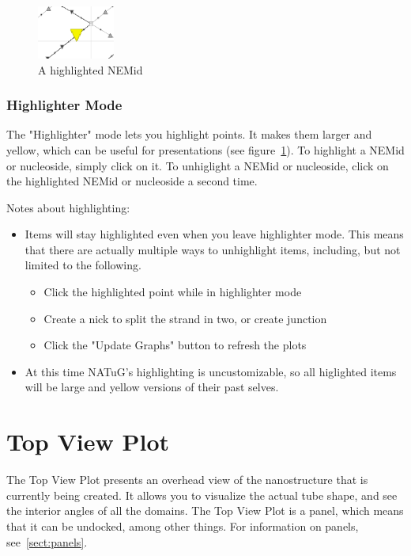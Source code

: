 \documentclass[
titlepage,
fontsize=12pt
]{article}
\begin{document}
	\begin{figure}
		\centering
		\includegraphics[width=1in]{highlighted-nemid.png}
		\caption{A highlighted NEMid}
		\label{fig:highlighted-NEMid}
	\end{figure}

	\subsubsection{Highlighter Mode}

	The "Highlighter" mode lets you highlight points. It makes them larger and yellow, which can be useful for presentations (see figure~\ref{fig:highlighted-NEMid}). 
	To highlight a NEMid or nucleoside, simply click on it. To unhiglight a NEMid or nucleoside, click on the highlighted NEMid or nucleoside a second time.
	
	Notes about highlighting:
	\begin{itemize}
		\item Items will stay highlighted even when you leave highlighter mode. This means that there are actually multiple ways to unhighlight items, including, but not limited to the following.
		\begin{itemize}
			\item Click the highlighted point while in highlighter mode
			\item Create a nick to split the strand in two, or create junction
			\item Click the "Update Graphs" button to refresh the plots
		\end{itemize}
		\item At this time NATuG's highlighting is uncustomizable, so all higlighted items will be large and yellow versions of their past selves.
	\end{itemize}
	
	\section{Top View Plot}
	
	The Top View Plot presents an overhead view of the nanostructure that is currently being created. It allows you to visualize the actual tube shape, and see the interior angles of all the domains. The Top View Plot is a panel, which means that it can be undocked, among other things. For information on panels, see~\ref{sect:panels}.
	
\end{document}
